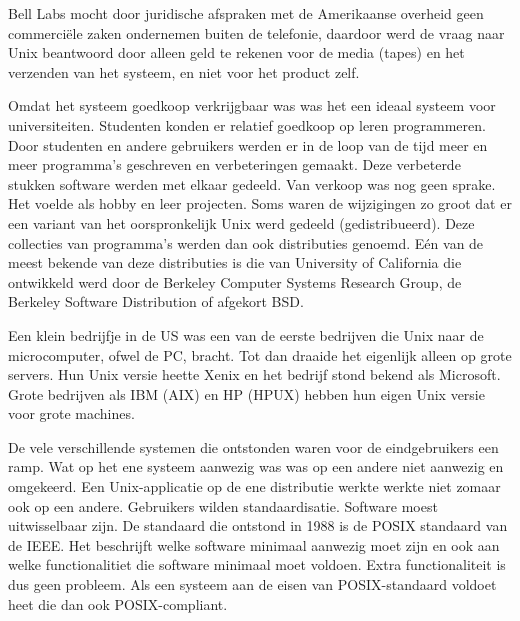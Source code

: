 Bell Labs mocht door juridische afspraken met de Amerikaanse overheid geen commerci\"ele zaken ondernemen buiten de telefonie, daardoor werd de
vraag naar Unix beantwoord door alleen geld te rekenen voor de media (tapes) en het verzenden van het systeem, en niet voor het
product zelf.\par

Omdat het systeem goedkoop verkrijgbaar was was het een ideaal systeem voor universiteiten. Studenten konden er relatief goedkoop op leren programmeren. Door studenten en andere
gebruikers werden er in de loop van de tijd meer en meer programma's geschreven en verbeteringen gemaakt. Deze verbeterde stukken software werden met elkaar gedeeld. Van verkoop was nog geen sprake. Het voelde als hobby en leer projecten. Soms waren de wijzigingen zo groot dat er een variant van het oorspronkelijk Unix werd gedeeld (gedistribueerd). Deze collecties van programma's werden dan ook distributies genoemd. E\'en van de meest bekende van deze distributies is die van University of California die ontwikkeld werd door de Berkeley Computer Systems Research Group, de Berkeley Software Distribution of afgekort BSD.

Een klein bedrijfje in de US was een van de eerste bedrijven die Unix naar de microcomputer, ofwel de PC, bracht. Tot dan draaide het eigenlijk alleen op grote servers. Hun Unix versie heette Xenix en het bedrijf stond bekend als Microsoft. Grote bedrijven als IBM (AIX) en HP (HPUX) hebben hun eigen Unix versie voor grote machines.

De vele verschillende systemen die ontstonden waren voor de eindgebruikers een ramp. Wat op het ene systeem aanwezig was
was op een andere niet aanwezig en omgekeerd. Een Unix-applicatie op de ene distributie werkte werkte niet zomaar ook
op een andere. Gebruikers wilden standaardisatie. Software moest uitwisselbaar zijn. De standaard die ontstond in 1988
is de POSIX standaard van de IEEE. Het beschrijft welke software minimaal aanwezig moet zijn en ook aan welke functionalitiet die software minimaal moet voldoen. Extra functionaliteit is dus geen probleem. Als een systeem aan de eisen van POSIX-standaard voldoet heet die dan ook POSIX-compliant.

